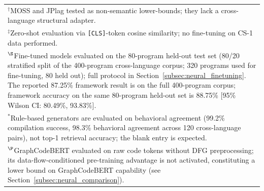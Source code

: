 \begin{table}[t]
\begin{tabular}{|l|c|c|c|c|c|c|}
\hline
\multicolumn{7}{p{0.98\linewidth}}{$^{\dagger}$MOSS and JPlag tested as non-semantic lower-bounds; they lack a cross-language structural adapter.} \\
\multicolumn{7}{p{0.98\linewidth}}{$^{\ddagger}$Zero-shot evaluation via \texttt{[CLS]}-token cosine similarity; no fine-tuning on CS-1 data performed.} \\
\multicolumn{7}{p{0.98\linewidth}}{$^{\S}$Fine-tuned models evaluated on the 80-program held-out test set (80/20 stratified split of the 400-program cross-language corpus; 320 programs used for fine-tuning, 80 held out); full protocol in Section~\ref{subsec:neural_finetuning}. The reported 87.25\% framework result is on the full 400-program corpus; framework accuracy on the same 80-program held-out set is 88.75\% [95\% Wilson CI: 80.49\%, 93.83\%].} \\
\multicolumn{7}{p{0.98\linewidth}}{$^{*}$Rule-based generators are evaluated on behavioral agreement (99.2\% compilation success, 98.3\% behavioral agreement across 120 cross-language pairs), not top-1 retrieval accuracy; the blank entry is expected.} \\
\multicolumn{7}{p{0.98\linewidth}}{$^{\P}$GraphCodeBERT evaluated on raw code tokens without DFG preprocessing; its data-flow-conditioned pre-training advantage is not activated, constituting a lower bound on GraphCodeBERT capability {(see Section~\ref{subsec:neural_comparison}).}} \\
\end{tabular}
\end{table}
